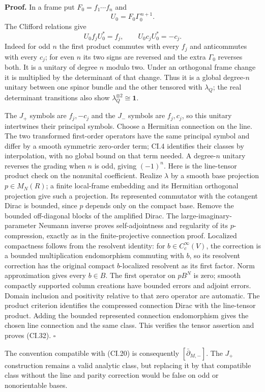\documentclass[
  11pt,
]{article}
\begin{document}
\textbf{Proof.} In a frame put \(F_0=f_1\cdots f_n\) and \[
 U_0=F_0\Gamma_0^{\,n+1}.
\] The Clifford relations give \[
 U_0 f_jU_0^*=f_j,\qquad U_0c_jU_0^*=-c_j.
\] Indeed for odd \(n\) the first product commutes with every \(f_j\)
and anticommutes with every \(c_j\); for even \(n\) its two signs are
reversed and the extra \(\Gamma_0\) reverses both. It is a unitary of
degree \(n\) modulo two. Under an orthogonal frame change it is
multiplied by the determinant of that change. Thus it is a global
degree-\(n\) unitary between one spinor bundle and the other tensored
with \(\lambda_Q\); the real determinant transitions also show
\(\lambda_Q^{\otimes2}\cong\mathbf1\).

The \(J_+\) symbols are \(f_j,-c_j\) and the \(J_-\) symbols are
\(f_j,c_j\), so this unitary intertwines their principal symbols. Choose
a Hermitian connection on the line. The two transformed first-order
operators have the same principal symbol and differ by a smooth
symmetric zero-order term; CI.4 identifies their classes by
interpolation, with no global bound on that term needed. A degree-\(n\)
unitary reverses the grading when \(n\) is odd, giving \((-1)^n\). Here
is the line-tensor product check on the nonunital coefficient. Realize
\(\lambda\) by a smooth base projection \(p\in M_N(R)\); a finite
local-frame embedding and its Hermitian orthogonal projection give such
a projection. Its represented commutator with the cotangent Dirac is
bounded, since \(p\) depends only on the compact base. Remove the
bounded off-diagonal blocks of the amplified Dirac. The
large-imaginary-parameter Neumann inverse proves self-adjointness and
regularity of its \(p\)-compression, exactly as in the finite-projective
connection proof. Localized compactness follows from the resolvent
identity: for \(b\in C_c^\infty(V)\), the correction is a bounded
multiplication endomorphism commuting with \(b\), so its resolvent
correction has the original compact \(b\)-localized resolvent as its
first factor. Norm approximation gives every \(b\in B\). The first
operator on \(pB^N\) is zero; smooth compactly supported column
creations have bounded errors and adjoint errors. Domain inclusion and
positivity relative to that zero operator are automatic. The product
criterion identifies the compressed connection Dirac with the
line-tensor product. Adding the bounded represented connection
endomorphism gives the chosen line connection and the same class. This
verifies the tensor assertion and proves (CI.32). \(\square\)

The convention compatible with (CI.20) is consequently
\([\bar\partial_{M,-}]\). The \(J_+\) construction remains a valid
analytic class, but replacing it by that compatible class without the
line and parity correction would be false on odd or nonorientable bases.
\end{document}
